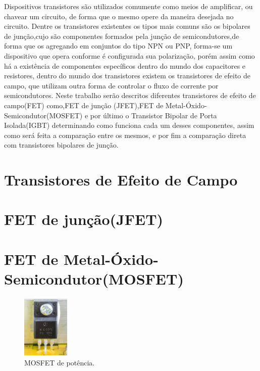 \documentclass[12pt]{article}
\begin{document}
    Dispositivos transistores são utilizados comumente como meios de amplificar, ou chavear um circuito, de forma que o mesmo opere da maneira desejada no circuito. Dentre os transistores existentes os tipos mais comuns são os bipolares de junção,cujo são componentes formados pela junção de semicondutores,de forma que os agregando em conjuntos do tipo NPN ou PNP, forma-se um dispositivo que opera conforme é configurada sua polarização, porém assim como há a existência de componentes específicos dentro do mundo dos capacitores e resistores, dentro do mundo dos transistores existem os transistores de efeito de campo, que utilizam outra forma de controlar o fluxo de corrente por semicondutores. Neste trabalho serão descritos diferentes transistores de efeito de campo(FET) como,FET de junção (JFET),FET de Metal-Óxido-Semicondutor(MOSFET) e por último o Transistor Bipolar de Porta Isolada(IGBT) determinando como funciona cada um desses componentes, assim como será feita a comparação entre os mesmos, e por fim a comparação direta com transistores bipolares de junção.

\newpage

\section{Transistores de Efeito de Campo}

\section{FET de junção(JFET)}

\section{FET de Metal-Óxido-Semicondutor(MOSFET)}

        \begin{figure}[htpb!]
            
            \centering
            \includegraphics[width=0.2\textwidth]{./images/Dell_Professional_P2212H_-_power_supply_board_-_K4101FS-2149.jpg}
            \caption{MOSFET de potência.} 

        \end{figure}
\end{document}
